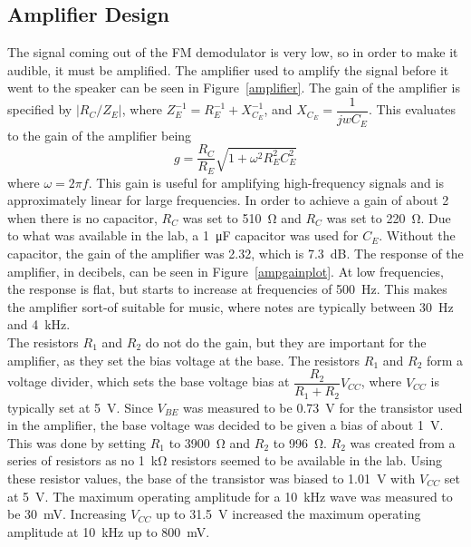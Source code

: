 \documentclass[11pt,letterpaper]{article}
\begin{document}
\subsection{Amplifier Design}

The signal coming out of the FM demodulator is very low, so in order to make it
audible, it must be amplified. The amplifier used to amplify the signal before
it went to the speaker can be seen in Figure~\ref{amplifier}. The gain of the
amplifier is specified by $|R_C / Z_E|$, where
$Z_E^{-1} = R_E^{-1} + X_{C_E}^{-1}$, and $X_{C_E} = \dfrac{1}{jwC_E}$. This
evaluates to the gain of the amplifier being
\begin{equation}
    g = \frac{R_C}{R_E} \sqrt{1 + \omega^2 R_E^2 C_E^2}
    \label{ampgain}
\end{equation}
where $\omega = 2\pi f$. This gain is useful for amplifying high-frequency
signals and is approximately linear for large frequencies. In order to achieve a
gain of about 2 when there is no capacitor, $R_C$ was set to \SI{510}{\ohm} and
$R_C$ was set to \SI{220}{\ohm}. Due to what was available in the lab, a 
\SI{1}{\micro\farad} capacitor was used for $C_E$. Without the capacitor, the
gain of the amplifier was 2.32, which is \SI{7.3}{\deci\bel}. The response of
the amplifier, in decibels, can be seen in Figure~\ref{ampgainplot}. At low
frequencies, the response is flat, but starts to increase at frequencies of
\SI{500}{\hertz}. This makes the amplifier sort-of suitable for music, where
notes are typically between \SI{30}{Hz} and \SI{4}{\kilo\hertz}.\\

The resistors $R_1$ and $R_2$ do not do the gain, but they are important for the
amplifier, as they set the bias voltage at the base. The resistors $R_1$ and
$R_2$ form a voltage divider, which sets the base voltage bias at
$\dfrac{R_2}{R_1 + R_2} V_{CC}$, where $V_{CC}$ is typically set at
\SI{5}{\volt}. Since $V_{BE}$ was measured to be \SI{0.73}{\volt} for the
transistor used in the amplifier, the base voltage was decided to be given a
bias of about \SI{1}{\volt}. This was done by setting $R_1$ to \SI{3900}{\ohm}
and $R_2$ to \SI{996}{\ohm}. $R_2$ was created from a series of resistors as no
\SI{1}{\kilo\ohm} resistors seemed to be available in the lab. Using these
resistor values, the base of the transistor was biased to \SI{1.01}{\volt} with
$V_{CC}$ set at \SI{5}{\volt}. The maximum operating amplitude for a 
\SI{10}{\kilo\hertz} wave was measured to be \SI{30}{\milli\volt}. Increasing
$V_{CC}$ up to \SI{31.5}{\volt} increased the maximum operating amplitude at 
\SI{10}{\kilo\hertz} up to \SI{800}{\milli\volt}.
\end{document}
